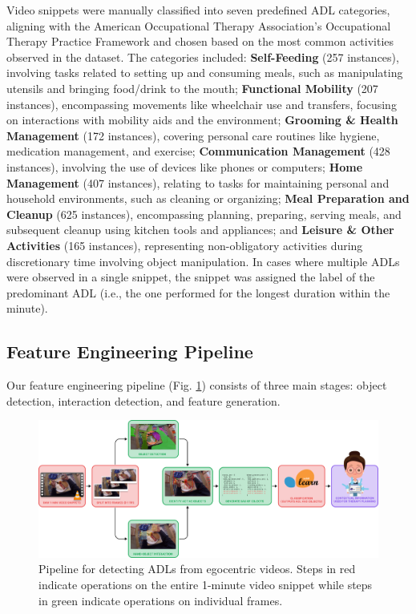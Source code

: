 \documentclass[journal,twoside,web]{ieeecolor}
\begin{document}
Video snippets were manually classified into seven predefined ADL categories, aligning with the American Occupational Therapy Association's Occupational Therapy Practice Framework \cite{Aota2020-xa} and chosen based on the most common activities observed in the dataset. The categories included: \textbf{Self-Feeding} (257 instances), involving tasks related to setting up and consuming meals, such as manipulating utensils and bringing food/drink to the mouth; \textbf{Functional Mobility} (207 instances), encompassing movements like wheelchair use and transfers, focusing on interactions with mobility aids and the environment; \textbf{Grooming \& Health Management} (172 instances), covering personal care routines like hygiene, medication management, and exercise; \textbf{Communication Management} (428 instances), involving the use of devices like phones or computers; \textbf{Home Management} (407 instances), relating to tasks for maintaining personal and household environments, such as cleaning or organizing; \textbf{Meal Preparation and Cleanup} (625 instances), encompassing planning, preparing, serving meals, and subsequent cleanup using kitchen tools and appliances; and \textbf{Leisure \& Other Activities} (165 instances), representing non-obligatory activities during discretionary time involving object manipulation. In cases where multiple ADLs were observed in a single snippet, the snippet was assigned the label of the predominant ADL (i.e., the one performed for the longest duration within the minute).

\subsection{Feature Engineering Pipeline}

Our feature engineering pipeline (Fig. \ref{fig:pipeline}) consists of three main stages: object detection, interaction detection, and feature generation.

\begin{figure}[t!]
    \centering
    \includegraphics[width=1\linewidth]{figs/flowchart.png}
    \caption{Pipeline for detecting ADLs from egocentric videos. Steps in red indicate operations on the entire 1-minute video snippet while steps in green indicate operations on individual frames.}
    \label{fig:pipeline}
\end{figure}
\end{document}
